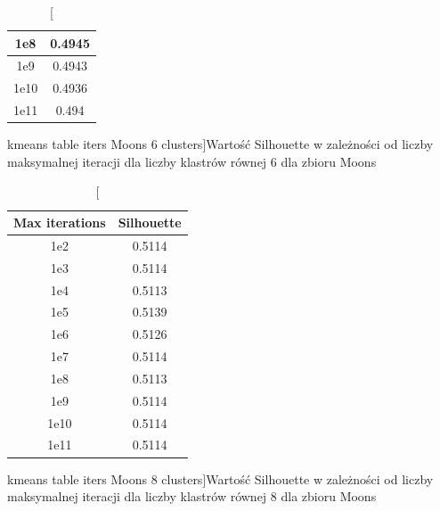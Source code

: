 \documentclass{classrep}
\begin{document}
{{\begin{table}[!htbp]
\begin{minipage}{.48\textwidth}
\begin{tabular}{|c|c|}
                        1e8 & 0.4945 \\ \hline
                        1e9 & 0.4943 \\ \hline
                        1e10 & 0.4936 \\ \hline
                        1e11 & 0.494 \\ \hline
                    \end{tabular}
                    \caption
                    [kmeans table iters Moons 6 clusters]{Wartość Silhouette w
                    zależności od liczby maksymalnej iteracji dla liczby klastrów
                    równej 6 dla zbioru Moons}
                    \label{kmeans_table_iters_Moons_6_clusters}
                \end{minipage}
                \hfill
            \end{table}
            \FloatBarrier
            \begin{table}[!htbp]
                \begin{minipage}{.48\textwidth}
                    \centering
                    \begin{tabular}{|c|c|}
                        \hline
                        Max iterations & Silhouette \\ \hline
                        1e2 & 0.5114 \\ \hline
                        1e3 & 0.5114 \\ \hline
                        1e4 & 0.5113 \\ \hline
                        1e5 & 0.5139 \\ \hline
                        1e6 & 0.5126 \\ \hline
                        1e7 & 0.5114 \\ \hline
                        1e8 & 0.5113 \\ \hline
                        1e9 & 0.5114 \\ \hline
                        1e10 & 0.5114 \\ \hline
                        1e11 & 0.5114 \\ \hline
                    \end{tabular}
                    \caption
                    [kmeans table iters Moons 8 clusters]{Wartość Silhouette w
                    zależności od liczby maksymalnej iteracji dla liczby klastrów
                    równej 8 dla zbioru Moons}
                    \label{kmeans_table_iters_Moons_8_clusters}
                \end{minipage}

\end{table}}}
\end{document}
